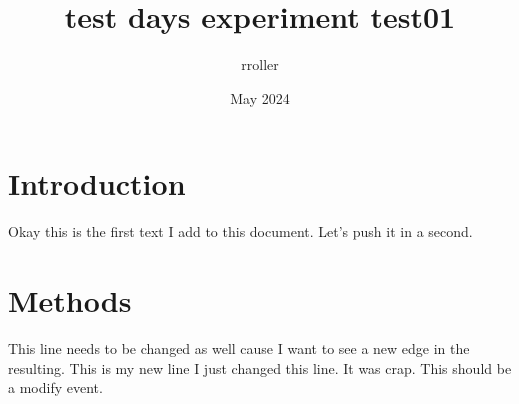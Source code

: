 \documentclass{article}
\title{test days experiment test01}
\author{rroller }
\date{May 2024}
\begin{document}
\maketitle

\section{Introduction}
Okay this is the first text I add to this document. Let's push it in a second.


\section{Methods}
This line needs to be changed as well cause I want to see a new edge in the resulting.
This is my new line
I just changed this line. It was crap. This should be a modify event.
\end{document}
